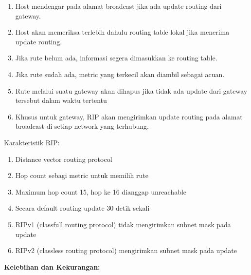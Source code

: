 \documentclass[a4paper,12pt]{article}
\begin{document}
\begin{enumerate}
	\item Host mendengar pada alamat broadcast jika ada update routing dari gateway.
	
	\item Host akan memeriksa terlebih dahulu routing table lokal jika menerima update routing.
	
	\item Jika rute belum ada, informasi segera dimasukkan ke routing table.
	
	\item Jika rute sudah ada, metric yang terkecil akan diambil sebagai acuan.
	
	\item Rute melalui suatu gateway akan dihapus jika tidak ada update dari gateway tersebut dalam waktu tertentu
	
	\item Khusus untuk gateway, RIP akan mengirimkan update routing pada alamat broadcast di setiap network yang terhubung.
	
\end{enumerate}

Karakteristik RIP:\\
\begin{enumerate}
	\item Distance vector routing protocol
	
	\item Hop count sebagi metric untuk memilih rute
	
	\item Maximum hop count 15, hop ke 16 dianggap unreachable
	
	\item Secara default routing update 30 detik sekali
	
	\item RIPv1 (classfull routing protocol) tidak mengirimkan subnet mask pada update
	
	\item RIPv2 (classless routing protocol) mengirimkan subnet mask pada update
	
\end{enumerate}

{\bfseries Kelebihan dan Kekurangan:\\}
\end{document}

